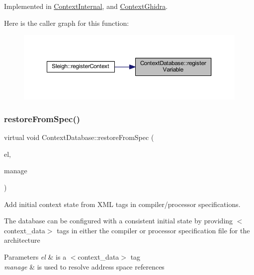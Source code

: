 Implemented in \mbox{\hyperlink{class_context_internal_ad4674e15208ed415b717d058edc1a140}{Context\+Internal}}, and \mbox{\hyperlink{class_context_ghidra_ab71324da92653ec926463cf81b741432}{Context\+Ghidra}}.

Here is the caller graph for this function\+:
\nopagebreak
\begin{figure}[H]
\begin{center}
\leavevmode
\includegraphics[width=350pt]{class_context_database_a990c6b94512bff06a37d4b59b7316a4f_icgraph}
\end{center}
\end{figure}
\mbox{\label{class_context_database_ab21ed86cbe093ccf2f5a81a7db4a7174}} 
\subsubsection{\texorpdfstring{restoreFromSpec()}{restoreFromSpec()}}
{\footnotesize\ttfamily virtual void Context\+Database\+::restore\+From\+Spec (\begin{DoxyParamCaption}\item[{const \mbox{\hyperlink{class_element}{Element}} $\ast$}]{el,  }\item[{const \mbox{\hyperlink{class_addr_space_manager}{Addr\+Space\+Manager}} $\ast$}]{manage }\end{DoxyParamCaption})\hspace{0.3cm}{\ttfamily [pure virtual]}}



Add initial context state from X\+ML tags in compiler/processor specifications. 

The database can be configured with a consistent initial state by providing $<$context\+\_\+data$>$ tags in either the compiler or processor specification file for the architecture 
\begin{DoxyParams}{Parameters}
{\em el} & is a $<$context\+\_\+data$>$ tag \\
\hline
{\em manage} & is used to resolve address space references \\
\hline
\end{DoxyParams}


